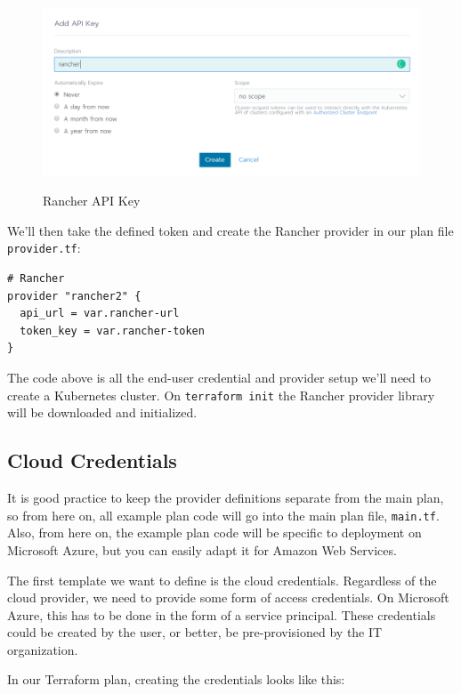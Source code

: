 \begin{figure}[H]
\centering
\caption {Rancher API Key}
\includegraphics[width=\linewidth]{images/rancher-api-key.png}
\label{fig:rancherAPI}
\end{figure}

We'll then take the defined token and create the Rancher provider in our plan file \verb|provider.tf|:

\begin{lstlisting}[caption=Rancher Provider, frame=single, basicstyle=\ttfamily]
# Rancher
provider "rancher2" {
  api_url = var.rancher-url
  token_key = var.rancher-token
}
\end{lstlisting}

The code above is all the end-user credential and provider setup we'll need to create a Kubernetes cluster. On \verb|terraform init| the Rancher provider library will be downloaded and initialized. 

\subsection{Cloud Credentials}

It is good practice to keep the provider definitions separate from the main plan, so from here on, all example plan code will go into the main plan file, \verb|main.tf|. Also, from here on, the example plan code will be specific to deployment on Microsoft Azure, but you can easily adapt it for Amazon Web Services.

The first template we want to define is the cloud credentials. Regardless of the cloud provider, we need to provide some form of access credentials. On Microsoft Azure, this has to be done in the form of a service principal. These credentials could be created by the user, or better, be pre-provisioned by the IT organization.

In our Terraform plan, creating the credentials looks like this:

